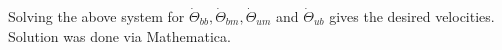 \documentclass[10pt]{article} %
\begin{document}
Solving the above system for $\dot{\Theta}_{bb}, \dot{\Theta}_{bm}, \dot{\Theta}_{um}$ and $\dot{\Theta}_{ub}$ gives the desired velocities. Solution was done via Mathematica.

\end{document}
